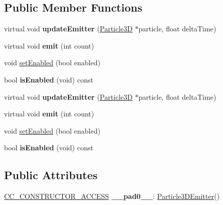 \subsection*{Public Member Functions}
\begin{DoxyCompactItemize}
\item 
\mbox{\label{classParticle3DEmitter_a5b7c0835a9e4f8f6b082a2661159427a}} 
virtual void {\bfseries update\+Emitter} (\hyperlink{structParticle3D}{Particle3D} $\ast$particle, float delta\+Time)
\item 
\mbox{\label{classParticle3DEmitter_ad0d9245e0551e3cfcea582c4cd42acbe}} 
virtual void {\bfseries emit} (int count)
\item 
void \hyperlink{classParticle3DEmitter_a98b31fc2e14b4a86788c923d773d0caa}{set\+Enabled} (bool enabled)
\item 
\mbox{\label{classParticle3DEmitter_a6f681bafa398577ab284cb292e157e77}} 
bool {\bfseries is\+Enabled} (void) const
\item 
\mbox{\label{classParticle3DEmitter_a8586cc121237a07457a0cd50399a7aa1}} 
virtual void {\bfseries update\+Emitter} (\hyperlink{structParticle3D}{Particle3D} $\ast$particle, float delta\+Time)
\item 
\mbox{\label{classParticle3DEmitter_ad2c17a3bfb52317ba8fd63a4afdfc540}} 
virtual void {\bfseries emit} (int count)
\item 
void \hyperlink{classParticle3DEmitter_a98b31fc2e14b4a86788c923d773d0caa}{set\+Enabled} (bool enabled)
\item 
\mbox{\label{classParticle3DEmitter_a6f681bafa398577ab284cb292e157e77}} 
bool {\bfseries is\+Enabled} (void) const
\end{DoxyCompactItemize}
\subsection*{Public Attributes}
\begin{DoxyCompactItemize}
\item 
\mbox{\label{classParticle3DEmitter_a1dfdeb15c6944bb0aac49b949eac0a60}} 
\hyperlink{_2cocos2d_2cocos_2base_2ccConfig_8h_a25ef1314f97c35a2ed3d029b0ead6da0}{C\+C\+\_\+\+C\+O\+N\+S\+T\+R\+U\+C\+T\+O\+R\+\_\+\+A\+C\+C\+E\+SS} {\bfseries \+\_\+\+\_\+pad0\+\_\+\+\_\+}\+: \hyperlink{classParticle3DEmitter}{Particle3\+D\+Emitter}()
\end{DoxyCompactItemize}
